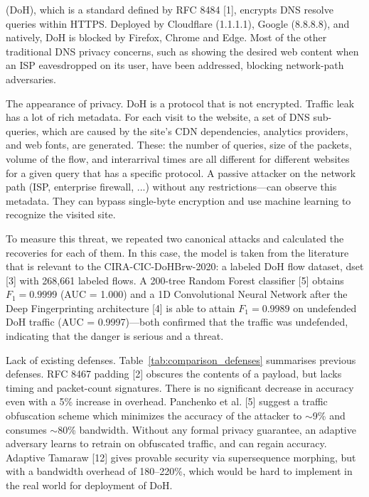 \documentclass[conference]{IEEEtran}
\begin{document}
 (DoH), which is a standard defined by RFC 8484 [1], encrypts DNS resolve queries within HTTPS. Deployed by Cloudflare (1.1.1.1), Google (8.8.8.8), and natively, DoH is blocked by Firefox, Chrome and Edge. Most of the other traditional DNS privacy concerns, such as showing the desired web content when an ISP eavesdropped on its user, have been addressed, blocking network-path adversaries.

The appearance of privacy. DoH is a protocol that is not encrypted. Traffic leak has a lot of rich metadata. For each visit to the website, a set of DNS sub-queries, which are caused by the site's CDN dependencies, analytics providers, and web fonts, are generated. These: the number of queries, size of the packets, volume of the flow, and interarrival times are all different for different websites for a given query that has a specific protocol. A passive attacker on the network path (ISP, enterprise firewall, ...) without any restrictions---can observe this metadata. They can bypass single-byte encryption and use machine learning to recognize the visited site.

To measure this threat, we repeated two canonical attacks and calculated the recoveries for each of them. In this case, the model is taken from the literature that is relevant to the CIRA-CIC-DoHBrw-2020: a labeled DoH flow dataset, dset [3] with 268,661 labeled flows. A 200-tree Random Forest classifier [5] obtains $F_1=0.9999$ (AUC = 1.000) and a 1D Convolutional Neural Network after the Deep Fingerprinting architecture [4] is able to attain $F_1=0.9989$ on undefended DoH traffic (AUC = 0.9997)---both confirmed that the traffic was undefended, indicating that the danger is serious and a threat.

Lack of existing defenses. Table~\ref{tab:comparison_defenses} summarises previous defenses. RFC 8467 padding [2] obscures the contents of a payload, but lacks timing and packet-count signatures. There is no significant decrease in accuracy even with a 5\% increase in overhead. Panchenko et al. [5] suggest a traffic obfuscation scheme which minimizes the accuracy of the attacker to $\sim$9\% and consumes $\sim$80\% bandwidth. Without any formal privacy guarantee, an adaptive adversary learns to retrain on obfuscated traffic, and can regain accuracy. Adaptive Tamaraw [12] gives provable security via supersequence morphing, but with a bandwidth overhead of 180--220\%, which would be hard to implement in the real world for deployment of DoH.
\end{document}
